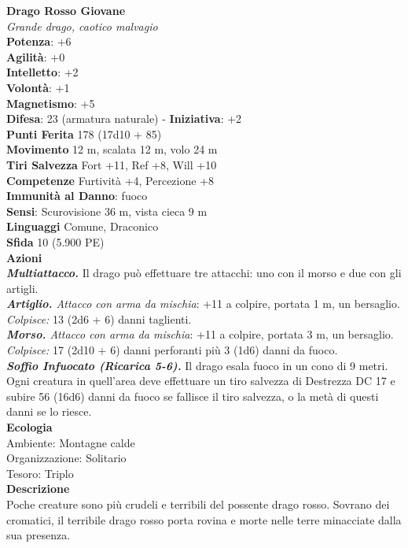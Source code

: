 \begin{multicols}{2}
\medskip\textbf{Drago Rosso Giovane}\\
\emph{Grande drago, caotico malvagio}\\
\textbf{Potenza}: +6\\
\textbf{Agilità}: +0\\
\textbf{Intelletto}: +2\\
\textbf{Volontà}: +1\\
\textbf{Magnetismo}: +5\\
\textbf{Difesa}: 23 (armatura naturale) - \textbf{Iniziativa}: +2\\
\textbf{Punti Ferita} 178 (17d10 + 85)\\
\textbf{Movimento} 12 m, scalata 12 m, volo 24 m\\
\textbf{Tiri Salvezza} Fort +11, Ref +8, Will +10\\
\textbf{Competenze} Furtività +4, Percezione +8\\
\textbf{Immunità al Danno}: fuoco\\
\textbf{Sensi}: Scurovisione 36 m, vista cieca 9 m\\
\textbf{Linguaggi} Comune, Draconico\\
\textbf{Sfida} 10 (5.900 PE)\smallskip\\
\smallskip\textbf{Azioni}\\
\emph{\textbf{Multiattacco.}} Il drago può effettuare tre attacchi: uno con il morso e due con gli artigli.\\
\emph{\textbf{Artiglio.} Attacco con arma da mischia}: +11 a colpire, portata 1 m, un bersaglio.\\
\emph{Colpisce:} 13 (2d6 + 6) danni taglienti. \\
\emph{\textbf{Morso.} Attacco con arma da mischia}: +11 a colpire, portata 3 m, un bersaglio.\\
\emph{Colpisce:} 17 (2d10 + 6) danni perforanti più 3 (1d6) danni da fuoco.\\
\emph{\textbf{Soffio Infuocato (Ricarica 5-6).}} Il drago esala fuoco in un cono di 9 metri. Ogni creatura in quell'area deve effettuare un tiro salvezza di Destrezza DC 17 e subire 56 (16d6) danni da fuoco se fallisce il tiro salvezza, o la metà di questi danni se lo riesce.\\
\textbf{Ecologia}\\
Ambiente: Montagne calde\\
Organizzazione: Solitario\\
Tesoro: Triplo\\
\textbf{Descrizione}\\
Poche creature sono più crudeli e terribili del possente drago rosso. Sovrano dei cromatici, il terribile drago rosso porta rovina e morte nelle terre minacciate dalla sua presenza.\\


\end{multicols}
